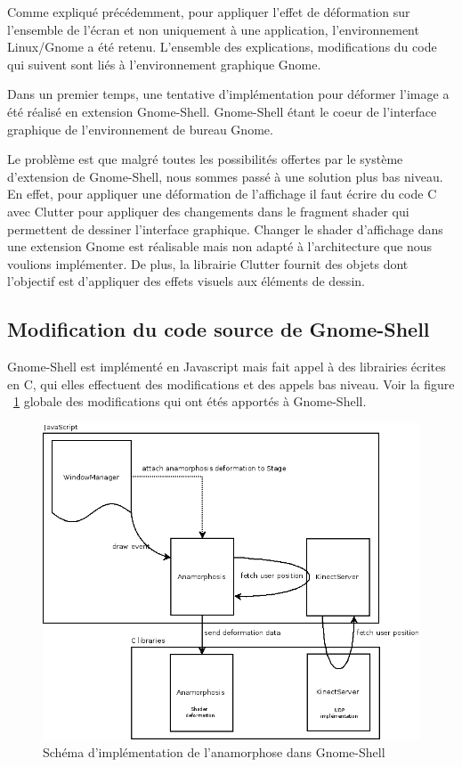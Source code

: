 Comme expliqué précédemment, pour appliquer l’effet de déformation sur l’ensemble de l’écran et non uniquement à une application, l’environnement Linux/Gnome a été retenu. L’ensemble des explications, modifications du code qui suivent sont liés à l’environnement graphique Gnome.

Dans un premier temps, une tentative d’implémentation pour déformer l’image a été réalisé en extension Gnome-Shell. Gnome-Shell étant le coeur de l'interface graphique de l'environnement de bureau Gnome.

Le problème est que malgré toutes les possibilités offertes par le système d’extension de Gnome-Shell, nous sommes passé à une solution plus bas niveau. En effet, pour appliquer une déformation de l’affichage il faut écrire du code C avec Clutter pour appliquer des changements dans le fragment shader qui permettent de dessiner l’interface graphique. Changer le shader d'affichage dans une extension Gnome est réalisable mais non adapté à l'architecture que nous voulions implémenter. De plus, la librairie Clutter fournit des objets dont l'objectif est d'appliquer des effets visuels aux éléments de dessin.

\subsection{Modification du code source de Gnome-Shell}
Gnome-Shell est implémenté en Javascript mais fait appel à des librairies écrites en C, qui elles effectuent des modifications et des appels bas niveau. Voir la figure ~\ref{fig:anamorphoseSchema} globale des modifications qui ont étés apportés à Gnome-Shell.

\begin{figure}[!h]
	\center	
	\includegraphics[scale=0.5]{image/anamorphose_schema.png}
	\caption{Schéma d'implémentation de l'anamorphose dans Gnome-Shell}
	\label{fig:anamorphoseSchema}
\end{figure}

